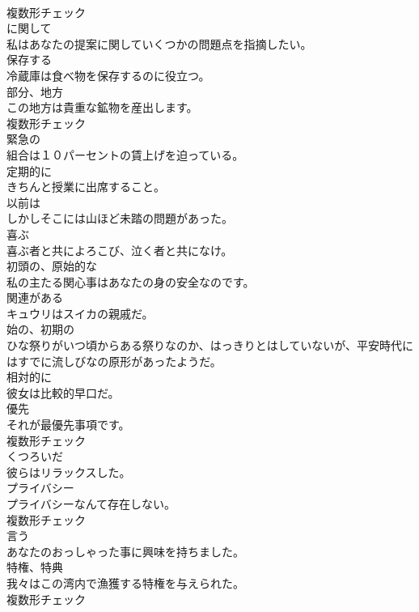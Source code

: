 \documentclass[8pt]{extreport}
\begin{document}
\begin{CJK}{UTF8}{min}
\\	複数形チェック
\\	[前置詞]	に関して	
\\	私はあなたの提案に関していくつかの問題点を指摘したい。	
\\	[動詞]	保存する	
\\	冷蔵庫は食べ物を保存するのに役立つ。	
\\	[名詞]	部分、地方	
\\	この地方は貴重な鉱物を産出します。	
\\	複数形チェック
\\	[形容詞]	緊急の	
\\	組合は１０パーセントの賃上げを迫っている。	
\\	[副詞]	定期的に	
\\	きちんと授業に出席すること。	
\\	[副詞]	以前は	
\\	しかしそこには山ほど未踏の問題があった。	
\\	[動詞]	喜ぶ	
\\	喜ぶ者と共によろこび、泣く者と共になけ。	
\\	[形容詞]	初頭の、原始的な	
\\	私の主たる関心事はあなたの身の安全なのです。	
\\	[形容詞]	関連がある	
\\	キュウリはスイカの親戚だ。	
\\	[形容詞]	始の、初期の	
\\	ひな祭りがいつ頃からある祭りなのか、はっきりとはしていないが、平安時代にはすでに流しびなの原形があったようだ。	
\\	[副詞]	相対的に	
\\	彼女は比較的早口だ。	
\\	[名詞]	優先	
\\	それが最優先事項です。	
\\	複数形チェック
\\	[形容詞]	くつろいだ	
\\	彼らはリラックスした。	
\\	[名詞]	プライバシー	
\\	プライバシーなんて存在しない。	
\\	複数形チェック
\\	[動詞]	言う	
\\	あなたのおっしゃった事に興味を持ちました。	
\\	[名詞]	特権、特典	
\\	我々はこの湾内で漁獲する特権を与えられた。	
\\	複数形チェック

\end{CJK}
\end{document}
